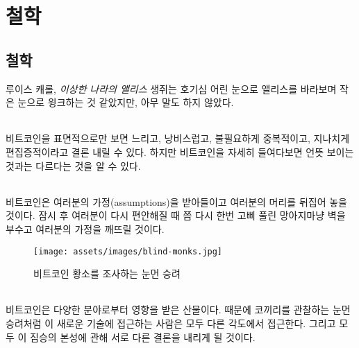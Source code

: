 \part{철학}
\label{ch:philosophy}
\chapter*{철학}

\begin{chapquote}{루이스 캐롤, \textit{이상한 나라의 앨리스}}
	생쥐는 호기심 어린 눈으로 앨리스를 바라보며 작은 눈으로 윙크하는 것 같았지만, 아무 말도 하지 않았다.
\end{chapquote}

\paragraph{}
비트코인을 표면적으로만 보면 느리고, 낭비스럽고, 불필요하게 중복적이고, 지나치게 편집증적이라고 결론 내릴 수 있다. 
하지만 비트코인을 자세히 들여다보면 언뜻 보이는 것과는 다르다는 것을 알 수 있다.

\paragraph{}
비트코인은 여러분의 가정(assumptions)을 받아들이고 여러분의 머리를 뒤집어 놓을 것이다.
잠시 후 여러분이 다시 편안해질 때 쯤 다시 한번 고삐 풀린 망아지마냥 벽을 부수고 여러분의 가정을 깨뜨릴 것이다.

\begin{figure}
	\texttt{[image: assets/images/blind-monks.jpg]}
	\caption{비트코인 황소를 조사하는 눈먼 승려}
	\label{fig:blind-monks}
\end{figure}

\paragraph{}
비트코인은 다양한 분야로부터 영향을 받은 산물이다.
때문에 코끼리를 관찰하는 눈먼 승려처럼 이 새로운 기술에 접근하는 사람은 모두 다른 각도에서 접근한다.
그리고 모두 이 짐승의 본성에 관해 서로 다른 결론을 내리게 될 것이다.

